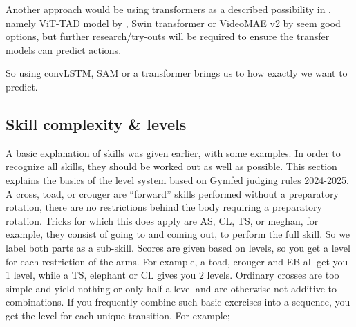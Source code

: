 Another approach would be using transformers as a described possibility in \textcite{Yin_2024}, namely
ViT-TAD model by \textcite{Yang_2023}, Swin transformer \textcite{Liu_2021} or VideoMAE v2 by \textcite{Wang_2023} seem good options, but further research/try-outs will be required to ensure the transfer models can predict actions.

So using convLSTM, SAM or a transformer brings us to how exactly we want to predict.






\subsection{Skill complexity \& levels}
\label{subsec:skillcomplexiteit}

A basic explanation of skills was given earlier, with some examples. In order to recognize all skills, they should be worked out as well as possible. This section explains the basics of the level system based on Gymfed judging rules 2024-2025.
A cross, toad, or crouger are “forward” skills performed without a preparatory rotation, there are no restrictions behind the body requiring a preparatory rotation. Tricks for which this does apply are AS, CL, TS, or meghan, for example, they consist of going to and coming out, to perform the full skill. So we label both parts as a sub-skill. Scores are given based on levels, so you get a level for each restriction of the arms. For example, a toad, crouger and EB all get you 1 level, while a TS, elephant or CL gives you 2 levels.
Ordinary crosses are too simple and yield nothing or only half a level and are otherwise not additive to combinations. If you frequently combine such basic exercises into a sequence, you get the level for each unique transition. For example;


